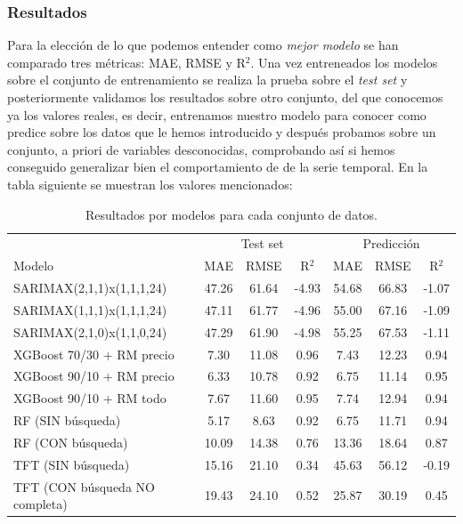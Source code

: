 \subsubsection{Resultados}
%
%
%
Para la elección de lo que podemos entender como \textit{mejor modelo} se han comparado tres métricas: MAE, RMSE y R$^2$. Una vez entreneados los modelos sobre el conjunto de entrenamiento se realiza la prueba sobre el \textit{test set} y posteriormente validamos los resultados sobre otro conjunto, del que conocemos ya los valores reales, es decir, entrenamos nuestro modelo para conocer como predice sobre los datos que le hemos introducido y después probamos sobre un conjunto, a priori de variables desconocidas, comprobando así si hemos conseguido generalizar bien el comportamiento de de la serie temporal. En la tabla siguiente se muestran los valores mencionados:
\begin{table}[H]
    \centering
    \begin{tabular}{l|ccc|ccc}
        & \multicolumn{3}{c}{Test set} & \multicolumn{3}{c}{Predicción} \\
        Modelo & MAE & RMSE & R$^2$ & MAE & RMSE & R$^2$ \\
        \hline
        SARIMAX(2,1,1)x(1,1,1,24) & 47.26 & 61.64 & -4.93 & 54.68 & 66.83 & -1.07 \\
        SARIMAX(1,1,1)x(1,1,1,24) & 47.11 & 61.77 & -4.96 & 55.00 & 67.16 & -1.09 \\
        SARIMAX(2,1,0)x(1,1,0,24) & 47.29 & 61.90 & -4.98 & 55.25 & 67.53 & -1.11 \\
        XGBoost 70/30 + RM precio  & 7.30  & 11.08 & 0.96 & 7.43  & 12.23 & 0.94 \\
        XGBoost 90/10 + RM precio  & 6.33  & 10.78 & 0.92 & 6.75  & 11.14 & 0.95 \\
        XGBoost 90/10 + RM todo    & 7.67  & 11.60 & 0.95 & 7.74  & 12.94 & 0.94 \\
        RF (SIN búsqueda) & 5.17  & 8.63  & 0.92 & 6.75  & 11.71 & 0.94 \\
        RF (CON búsqueda) & 10.09 & 14.38 & 0.76 & 13.36 & 18.64 & 0.87 \\
        TFT (SIN búsqueda)& 15.16    & 21.10    & 0.34   & 45.63    & 56.12          & -0.19 \\
        TFT (CON búsqueda NO completa)&19.43    & 24.10    & 0.52   & 25.87    & 30.19          & 0.45   \\
    \end{tabular}
    \caption{Resultados por modelos para cada conjunto de datos.}
    \label{tab:resultados_modelos}
\end{table}

